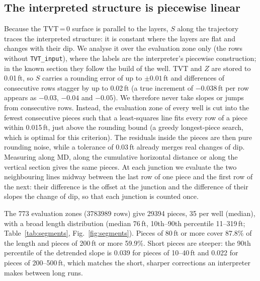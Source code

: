 \documentclass[preprint,12pt,authoryear]{elsarticle}
\newcommand{\Sv}{S}
\begin{document}
\subsection{The interpreted structure is piecewise linear}\label{sec:pwl}
Because the TVT\,=\,0 surface is parallel to the layers, $\Sv$ along the trajectory traces the interpreted structure: it is constant where the layers are flat and changes with their dip. We analyse it over the evaluation zone only (the rows without \texttt{TVT\_input}), where the labels are the interpreter's piecewise construction; in the known section they follow the build of the well. TVT and $Z$ are stored to 0.01\,ft, so $\Sv$ carries a rounding error of up to $\pm0.01$\,ft and differences of consecutive rows stagger by up to 0.02\,ft (a true increment of $-0.038$\,ft per row appears as $-0.03$, $-0.04$ and $-0.05$). We therefore never take slopes or jumps from consecutive rows. Instead, the evaluation zone of every well is cut into the fewest consecutive pieces such that a least-squares line fits every row of a piece within 0.015\,ft, just above the rounding bound (a greedy longest-piece search, which is optimal for this criterion). The residuals inside the pieces are then pure rounding noise, while a tolerance of 0.03\,ft already merges real changes of dip. Measuring along MD, along the cumulative horizontal distance or along the vertical section gives the same pieces. At each junction we evaluate the two neighbouring lines midway between the last row of one piece and the first row of the next: their difference is the offset at the junction and the difference of their slopes the change of dip, so that each junction is counted once.

The 773 evaluation zones (\num{3783989} rows) give \num{29394} pieces, 35 per well (median), with a broad length distribution (median 76\,ft, 10th--90th percentile 11--319\,ft; Table~\ref{tab:segments}, Fig.~\ref{fig:segments}). Pieces of 80\,ft or more cover 87.8\% of the length and pieces of 200\,ft or more 59.9\%. Short pieces are steeper: the 90th percentile of the detrended slope is 0.039 for pieces of 10--40\,ft and 0.022 for pieces of 200--500\,ft, which matches the short, sharper corrections an interpreter makes between long runs.
\end{document}
